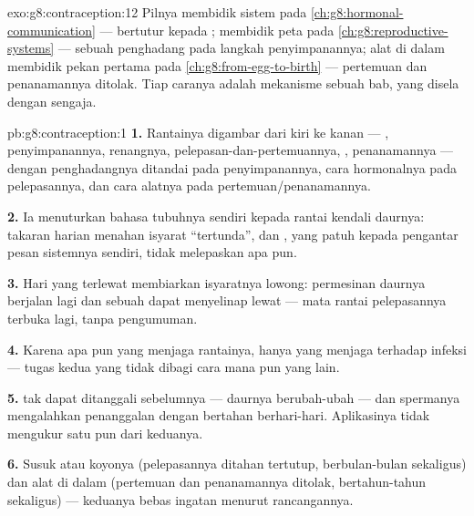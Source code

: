\begin{solution}{exo:g8:contraception:12}
Pilnya membidik sistem pada
\cref{ch:g8:hormonal-communication} --- bertutur 
kepada ;  membidik peta pada
\cref{ch:g8:reproductive-systems} --- sebuah penghadang pada
langkah penyimpanannya; alat di dalam  membidik
pekan pertama pada \cref{ch:g8:from-egg-to-birth} ---
pertemuan dan penanamannya ditolak. Tiap caranya adalah
mekanisme sebuah bab, yang disela dengan sengaja.
\end{solution}

\begin{solution}{pb:g8:contraception:1}
\textbf{1.} Rantainya digambar dari kiri ke kanan ---
, penyimpanannya, renangnya,
pelepasan-dan-pertemuannya, , penanamannya ---
dengan penghadangnya ditandai pada penyimpanannya, cara
hormonalnya pada pelepasannya, dan cara alatnya pada
pertemuan/penanamannya.

\textbf{2.} Ia menuturkan bahasa  tubuhnya sendiri
kepada rantai kendali daurnya: takaran harian menahan
isyarat ``tertunda'', dan , yang patuh kepada
pengantar pesan sistemnya sendiri, tidak melepaskan apa pun.

\textbf{3.} Hari yang terlewat membiarkan isyaratnya lowong:
permesinan daurnya berjalan lagi dan sebuah  dapat
menyelinap lewat --- mata rantai pelepasannya terbuka lagi,
tanpa pengumuman.

\textbf{4.} Karena apa pun yang menjaga rantainya, hanya
 yang menjaga terhadap infeksi --- tugas kedua yang
tidak dibagi cara mana pun yang lain.

\textbf{5.}  tak dapat ditanggali sebelumnya ---
daurnya berubah-ubah --- dan spermanya mengalahkan
penanggalan dengan bertahan berhari-hari. Aplikasinya tidak
mengukur satu pun dari keduanya.

\textbf{6.} Susuk atau koyonya (pelepasannya ditahan
tertutup, berbulan-bulan sekaligus) dan alat di dalam
 (pertemuan dan penanamannya ditolak,
bertahun-tahun sekaligus) --- keduanya bebas ingatan menurut
rancangannya.


\end{solution}
